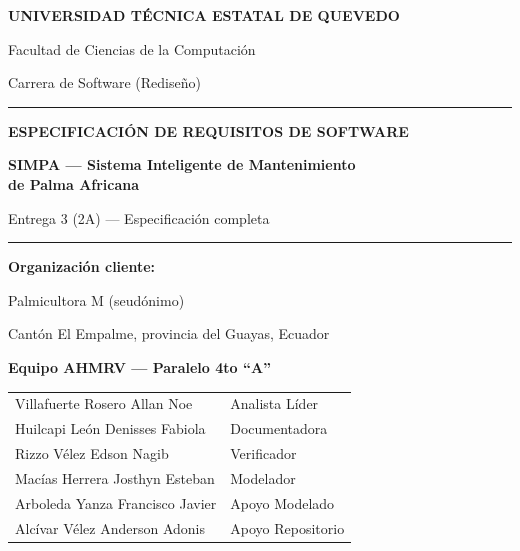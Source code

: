 \documentclass[11pt,a4paper]{article}
\begin{document}
\begin{titlepage}
\centering
\vspace*{0.8cm}
{\Large\bfseries UNIVERSIDAD TÉCNICA ESTATAL DE QUEVEDO\par}
\vspace{0.3cm}
{\large Facultad de Ciencias de la Computación\par}
{\large Carrera de Software (Rediseño)\par}
\vspace{1.2cm}
\rule{\textwidth}{1.2pt}\par
\vspace{0.5cm}
{\LARGE\bfseries\color{uteqverde} ESPECIFICACIÓN DE REQUISITOS DE SOFTWARE\par}
\vspace{0.4cm}
{\Large\bfseries SIMPA --- Sistema Inteligente de Mantenimiento\\[0.2cm] de Palma Africana\par}
\vspace{0.4cm}
{\large Entrega 3 (2A) --- Especificación completa\par}
\vspace{0.5cm}
\rule{\textwidth}{1.2pt}\par
\vspace{1.0cm}

{\large\bfseries Organización cliente:\par}
{\large Palmicultora M (seudónimo)\par}
{\normalsize Cantón El Empalme, provincia del Guayas, Ecuador\par}
\vspace{0.8cm}

{\bfseries Equipo AHMRV --- Paralelo 4to ``A''\par}
\vspace{0.3cm}
\begin{tabular}{ll}
Villafuerte Rosero Allan Noe & Analista Líder \\
Huilcapi León Denisses Fabiola & Documentadora \\
Rizzo Vélez Edson Nagib & Verificador \\
Macías Herrera Josthyn Esteban & Modelador \\
Arboleda Yanza Francisco Javier & Apoyo Modelado \\
Alcívar Vélez Anderson Adonis & Apoyo Repositorio \\
\end{tabular}


\end{titlepage}
\end{document}
